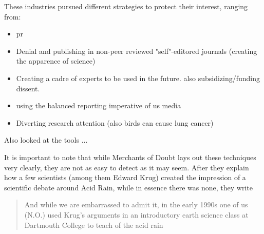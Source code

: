 These industries pursued different strategies to protect their interest, ranging from:
\begin{itemize}
\item \gls{pr}
\item Denial and publishing in non-peer reviewed "self"-editored journals (creating the apparence of science)
\item Creating a cadre of experts to be used in the future. also subsidizing/funding dissent.
\item using the balanced reporting imperative of us media
\item Diverting research attention (also birds can cause lung cancer) 
\end{itemize}


Also \cite{abdalla_grey_2021} looked at the tools ...

It is important to note that while Merchants of Doubt lays out these techniques very clearly, they are not as easy to detect as it may seem. 
After they explain how a few scientists (among them Edward Krug) created the impression of a scientific debate around Acid Rain, while in essence there was none, they write \begin{quote}
And while we are embarrassed to admit it, in the early 1990s one of us (N.O.) used Krug's arguments in an introductory earth science class at Dartmouth College to teach  of the acid rain 
\end{quote} \citep[p. 103]{oreskes_merchants_2010} 

\newpage